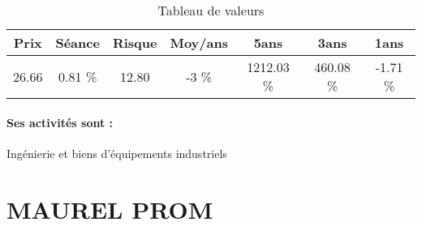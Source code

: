 \documentclass[11pt,a4paper]{report}%
\begin{document}
\begin{table}[H]
  \centering
    \begin{tabular}{|c|c|c|c|c|c|c|}
    \hline
    Prix & Séance & Risque  & Moy/ans & 5ans & 3ans & 1ans \\
    \hline
    26.66 &    0.81 \%    & 12.80 & -3 \% & 1212.03 \% & 460.08 \% & -1.71 \% \\
    \hline
    \end{tabular}%
        \label{tab:table_VALLOUREC}%
      \caption{Tableau de valeurs}
\end{table}%

\paragraph{Ses activités sont : } Ingénierie et biens d'équipements industriels 
    
    \newpage

\section{MAUREL PROM}
\end{document}
